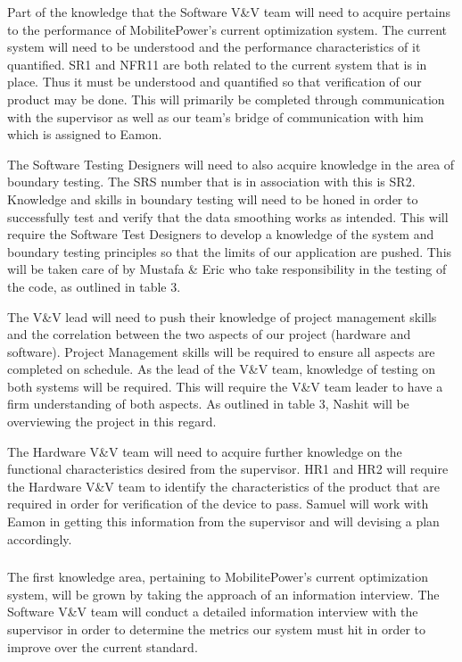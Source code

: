 \documentclass[12pt, titlepage]{article}
\begin{document}
Part of the knowledge that the Software V&V team will need to acquire pertains to the performance of MobilitePower’s current optimization system. The current system will need to be understood and the performance characteristics of it quantified. SR1 and NFR11 are both related to the current system that is in place. Thus it must be understood and quantified so that verification of our product may be done. This will primarily be completed through communication with the supervisor as well as our team's bridge of communication with him which is assigned to Eamon. 

The Software Testing Designers will need to also acquire knowledge in the area of boundary testing. The SRS number that is in association with this is SR2. Knowledge and skills in boundary testing will need to be honed in order to successfully test and verify that the data smoothing works as intended. This will require the Software Test Designers to develop a knowledge of the system and boundary testing principles so that the limits of our application are pushed. This will be taken care of by Mustafa \& Eric who take responsibility in the testing of the code, as outlined in table 3. 

The V\&V lead will need to push their knowledge of project management skills and the correlation between the two aspects of our project (hardware and software). Project Management skills will be required to ensure all aspects are completed on schedule. As the lead of the V\&V team, knowledge of testing on both systems will be required. This will require the V&V team leader to have a firm understanding of both aspects. As outlined in table 3, Nashit will be overviewing the project in this regard. 

The Hardware V\&V team will need to acquire further knowledge on the functional characteristics desired from the supervisor. HR1 and HR2 will require the Hardware V&V team to identify the characteristics of the product that are required in order for verification of the device to pass. Samuel will work with Eamon in getting this information from the supervisor and will devising a plan accordingly.  

\subsubsection{}

The first knowledge area, pertaining to MobilitePower’s current optimization system, will be grown by taking the approach of an information interview. The Software V\&V team will conduct a detailed information interview with the supervisor in order to determine the metrics our system must hit in order to improve over the current standard. 
\end{document}
